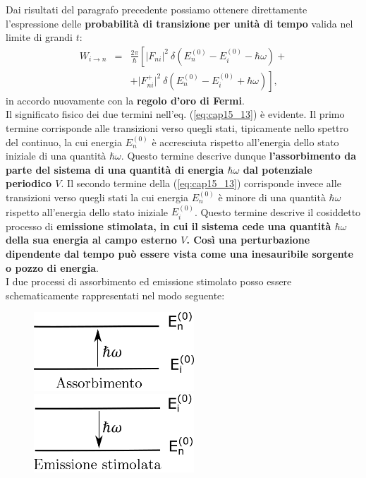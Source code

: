 \documentclass[a4paper,12pt,oneside]{book}
\begin{document}
Dai risultati del paragrafo precedente possiamo ottenere direttamente l'espressione delle \textbf{probabilità di transizione per unità di tempo} valida nel limite di grandi $t$:
\begin{eqnarray}
W_{i\rightarrow n} &=& \frac{2\pi}{\hbar}\left[ \vert F_{ni}\vert ^2 \ \delta (E_n^{(0)}-E_i^{(0)}-\hbar \omega) + \right.\nonumber \\
& &\left. +\vert F_{ni} ^+\vert ^2 \ \delta (E_n^{(0)}-E_i^{(0)}+\hbar \omega)\right],
\label{eq:cap15_13}
\end{eqnarray}
in accordo nuovamente con la \textbf{regolo d'oro di Fermi}.\\
Il significato fisico dei due termini nell'eq. (\ref{eq:cap15_13}) è evidente. Il primo termine corrisponde alle transizioni verso quegli stati, tipicamente nello spettro del continuo, la cui energia $E_n ^{(0)}$ è accresciuta rispetto all'energia dello stato iniziale di una quantità $\hbar \omega$. Questo termine descrive dunque \textbf{l'assorbimento da parte del sistema di una quantità di energia $\hbar \omega$ dal potenziale periodico $V$}. Il secondo termine della (\ref{eq:cap15_13}) corrisponde invece alle transizioni verso quegli stati la cui energia $E_n ^{(0)}$ è minore di una quantità $\hbar \omega$ rispetto all'energia dello stato iniziale $E_i ^{(0)}$. Questo termine descrive il cosiddetto processo di \textbf{emissione stimolata, in cui il sistema cede una quantità $\hbar \omega$ della sua energia al campo esterno $V$. Così una perturbazione dipendente dal tempo può essere vista come una inesauribile sorgente o pozzo di energia}.\\
I due processi di assorbimento ed emissione stimolato posso essere schematicamente rappresentati nel modo seguente:
\begin{figure}[!htbp]
\begin{center}
\includegraphics[width=6cm]{immagini/cap_15/fig_15_2.png}\hspace{1cm}
\includegraphics[width=6cm]{immagini/cap_15/fig_15_3.png}
\end{center}
\end{figure}
\newpage
\end{document}
